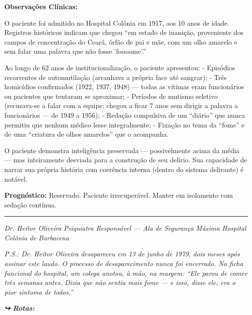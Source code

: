 \noindent \textbf{Observações Clínicas:}

\noindent O paciente foi admitido no Hospital Colônia em 1917, aos 10 anos de idade. Registros históricos indicam que chegou \textquotedblleft{}em estado de inanição, proveniente dos campos de concentração do Ceará, órfão de pai e mãe, com um olho amarelo e sem falar uma palavra que não fosse 'foooome'.\textquotedblright{}

\noindent Ao longo de 62 anos de institucionalização, o paciente apresentou:
- Episódios recorrentes de automutilação (arranhava a própria face até sangrar);
- Três homicídios confirmados (1922, 1937, 1948) --- todas as vítimas eram funcionários ou pacientes que tentaram se aproximar;
- Períodos de mutismo seletivo (recusava-se a falar com a equipe; chegou a ficar 7 anos sem dirigir a palavra a funcionários --- de 1949 a 1956);
- Redação compulsiva de um \textquotedblleft{}diário\textquotedblright{} que nunca permitiu que nenhum médico lesse integralmente;
- Fixação no tema da \textquotedblleft{}fome\textquotedblright{} e de uma \textquotedblleft{}criatura de olhos amarelos\textquotedblright{} que o acompanha.

\noindent O paciente demonstra inteligência preservada --- possivelmente acima da média --- mas inteiramente desviada para a construção de seu delírio. Sua capacidade de narrar sua própria história com coerência interna (dentro do sistema delirante) é notável.

\noindent \textbf{Prognóstico:} Reservado. Paciente irrecuperável. Manter em isolamento com sedação contínua.

\vspace{0.5em}\noindent\rule{\textwidth}{0.5pt}\vspace{0.5em}

\noindent \textit{Dr. Heitor Oliveira}
\textit{Psiquiatra Responsável --- Ala de Segurança Máxima}
\textit{Hospital Colônia de Barbacena}

\noindent \textit{P.S.: Dr. Heitor Oliveira desapareceu em 13 de junho de 1979, dois meses após assinar este laudo. O processo de desaparecimento nunca foi encerrado. Na ficha funcional do hospital, um colega anotou, à mão, na margem: \textquotedblleft{}Ele parou de comer três semanas antes. Dizia que não sentia mais fome --- e isso, disse ele, era o pior sintoma de todos.\textquotedblright{}}

\vspace{0.5em}
\noindent\textit{\textbf{↪ Rotas:}  \rotasep {}}